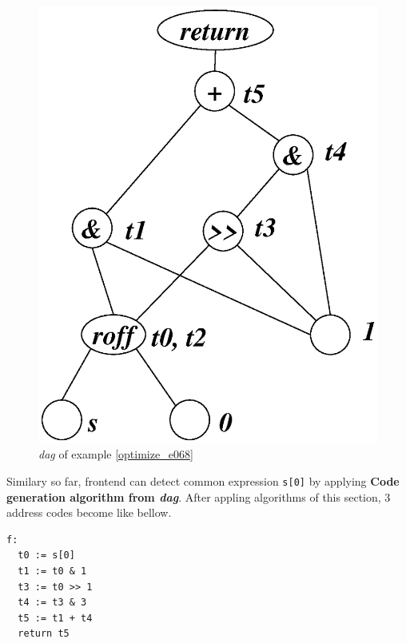 \begin{Example}
\begin{figure}[htbp]
\begin{center}
\begin{latexonly}
\includegraphics[width=0.826\linewidth,height=1.0\linewidth]{opt028.eps}
\end{latexonly}
\caption{{\em dag} of example \ref{optimize_e068}}
\label{optimize_e069}
\end{center}
\end{figure}
Similary so far, frontend can detect common expression {\tt{s[0]}}
by applying {\bf Code generation algorithm from {\em dag}}.
After appling algorithms of this section,
3 address codes become like bellow.
\begin{verbatim}
f:
  t0 := s[0]
  t1 := t0 & 1
  t3 := t0 >> 1
  t4 := t3 & 3
  t5 := t1 + t4
  return t5
\end{verbatim}
\end{Example}

